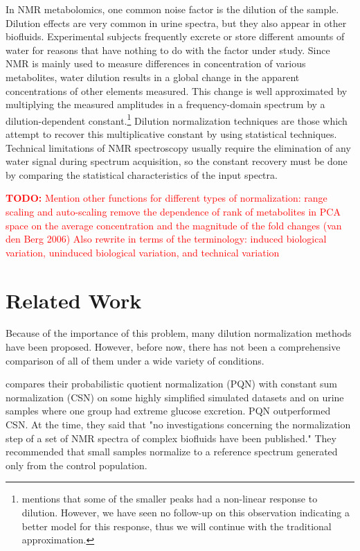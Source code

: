 \documentclass[english]{article}
\newcommand{\todo}[1]{\textcolor{red}{\textbf{TODO:} #1}}
\begin{document}
In NMR metabolomics, one common noise factor is the dilution of the sample. Dilution effects are very common in urine spectra, but they also appear in other biofluids. Experimental subjects frequently excrete or store different amounts of water for reasons that have nothing to do with the factor under study. Since NMR is mainly used to measure differences in concentration of various metabolites, water dilution results in a global change in the apparent concentrations of other elements measured. This change is well approximated by multiplying the measured amplitudes in a frequency-domain spectrum by a dilution-dependent constant.\footnote{\citep{Zhang2009a} mentions that some of the smaller peaks had a non-linear response to dilution. However, we have seen no follow-up on this observation indicating a better model for this response, thus we will continue with the traditional approximation.} Dilution normalization techniques are those which attempt to recover this multiplicative constant by using statistical techniques. Technical limitations of NMR spectroscopy usually require the elimination of any water signal during spectrum acquisition, so the constant recovery must be done by comparing the statistical characteristics of the input spectra.

\todo{Mention other functions for different types of normalization: range scaling and auto-scaling remove the dependence of rank of metabolites in PCA space on the average concentration and the magnitude of the fold changes (van den Berg 2006) Also rewrite in terms of the terminology: induced biological variation, uninduced biological variation, and technical variation}

\section{Related Work}
Because of the importance of this problem, many dilution normalization methods have been proposed. However, before now, there has not been a comprehensive comparison of all of them under a wide variety of conditions.

\citep{VanDenBerg2006} compares their probabilistic quotient normalization (PQN) with constant sum normalization (CSN) on some highly simplified simulated datasets and on urine samples where one group had extreme glucose excretion. PQN outperformed CSN. At the time, they said that "no investigations concerning the normalization step of a set of NMR spectra of complex biofluids have been published." They recommended that small samples normalize to a reference spectrum generated only from the control population.
\end{document}
